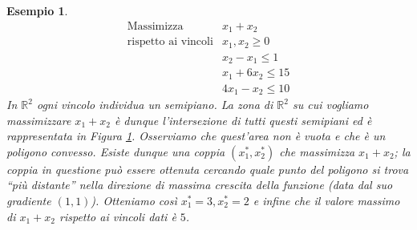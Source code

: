 \documentclass[italian, letter paper, 12pt, reqno]{article}
\theoremstyle{myteo}
\newtheorem{example}[theorem]{Esempio}
\numberwithin{equation}{section}
\begin{document}
\begin{example}
  \label{es:problema_lineare}
  \begin{equation*}
    \begin{array}{ll}
      \text{Massimizza} & x_1 + x_2\\
      \text{rispetto ai vincoli} & x_1, x_2\geq 0\\
                        & x_2 - x_1 \leq 1\\
                        & x_1 + 6x_2 \leq 15\\
                        & 4x_1 - x_2 \leq 10
    \end{array}
  \end{equation*}
  In \(\mathbb{R}^2\) ogni vincolo individua un semipiano.
  La zona di \(\mathbb{R}^2\) su cui vogliamo massimizzare \(x_1+x_2\) è dunque l'intersezione di tutti questi semipiani ed è rappresentata in Figura \ref{fig:problema_lineare}.
  Osserviamo che quest'area non è vuota e che è un poligono convesso.
  Esiste dunque una coppia \((x_1^*,x_2^*)\) che massimizza \(x_1+x_2\); la coppia in questione può essere ottenuta cercando quale punto del poligono si trova ``più distante'' nella direzione di massima crescita della funzione (data dal suo gradiente \((1, 1)\)).
  Otteniamo così \(x_1^*=3, x_2^*=2\) e infine che il valore massimo di \(x_1+x_2\) rispetto ai vincoli dati è \(5\).

  \begin{figure}
    \begin{center}
    \end{center}
    \caption{}
    \label{fig:problema_lineare}
  \end{figure}
\end{example}
\end{document}
